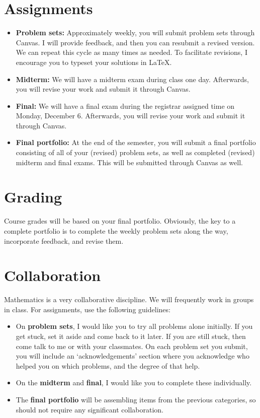 \documentclass{article}
\begin{document}
\section*{\fontsize{12}{15}\selectfont Assignments}
\begin{itemize}
\item \textbf{Problem sets: } Approximately weekly, you will submit problem sets through Canvas.  I will provide feedback, and then you can resubmit a revised version. We can repeat this cycle as many times as needed. To facilitate revisions, I encourage you to typeset your solutions in \LaTeX.
\item \textbf{Midterm: } We will have a midterm exam during class one day. Afterwards, you will revise your work and submit it through Canvas.
\item \textbf{Final: } We will have a final exam during the registrar assigned time on Monday, December 6. Afterwards, you will revise your work and submit it through Canvas.
\item \textbf{Final portfolio: } At the end of the semester, you will submit a final portfolio consisting of all of your (revised) problem sets, as well as completed (revised) midterm and final exams.  This will be submitted through Canvas as well.
\end{itemize}


\section*{\fontsize{12}{15}\selectfont Grading}
Course grades will be based on your final portfolio. Obviously, the key to a complete portfolio is to complete the weekly problem sets along the way, incorporate feedback, and revise them.

\section*{\fontsize{12}{15}\selectfont Collaboration}
Mathematics is a very collaborative discipline. We will frequently work in groups in class.  For assignments, use the following guidelines:
\begin{itemize}
\item On \textbf{problem sets}, I would like you to try all problems alone initially. If you get stuck, set it aside and come back to it later.  If you are still stuck, then come talk to me or with your classmates.  On each problem set you submit, you will include an `acknowledgements' section where you acknowledge who helped you on which problems, and the degree of that help.
\item On the \textbf{midterm} and \textbf{final}, I would like you to complete these individually. 
\item The \textbf{final portfolio} will be assembling items from the previous categories, so should not require any significant collaboration.
\end{itemize}
\end{document}
